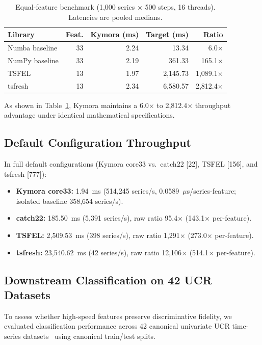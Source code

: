 \documentclass[10pt,twocolumn,letterpaper]{article}
\begin{document}
\begin{table}[h]
\centering
\small
\caption{Equal-feature benchmark (1,000 series $\times$ 500 steps, 16 threads). Latencies are pooled medians.}
\label{tab:equal_feature}
\begin{tabular}{lrrrr}
\toprule
\textbf{Library} & \textbf{Feat.} & \textbf{Kymora (ms)} & \textbf{Target (ms)} & \textbf{Ratio} \\
\midrule
Numba baseline   & 33 & 2.24 & 13.34     & 6.0$\times$ \\
NumPy baseline   & 33 & 2.19 & 361.33    & 165.1$\times$ \\
TSFEL            & 13 & 1.97 & 2,145.73  & 1,089.1$\times$ \\
tsfresh          & 13 & 2.34 & 6,580.57  & 2,812.4$\times$ \\
\bottomrule
\end{tabular}
\end{table}

As shown in Table~\ref{tab:equal_feature}, Kymora maintains a 6.0$\times$ to 2,812.4$\times$ throughput advantage under identical mathematical specifications.

\subsection{Default Configuration Throughput}
In full default configurations (Kymora core33 vs.\ catch22 [22], TSFEL [156], and tsfresh [777]):
\begin{itemize}
    \item \textbf{Kymora core33:} 1.94~ms (514,245 series/s, 0.0589~$\mu$s/series-feature; isolated baseline 358,654 series/s).
    \item \textbf{catch22:} 185.50~ms (5,391 series/s), raw ratio 95.4$\times$ (143.1$\times$ per-feature).
    \item \textbf{TSFEL:} 2,509.53~ms (398 series/s), raw ratio 1,291$\times$ (273.0$\times$ per-feature).
    \item \textbf{tsfresh:} 23,540.62~ms (42 series/s), raw ratio 12,106$\times$ (514.1$\times$ per-feature).
\end{itemize}

\subsection{Downstream Classification on 42 UCR Datasets}
To assess whether high-speed features preserve discriminative fidelity, we evaluated classification performance across 42 canonical univariate UCR time-series datasets~\cite{dau2019ucr} using canonical train/test splits.
\end{document}
